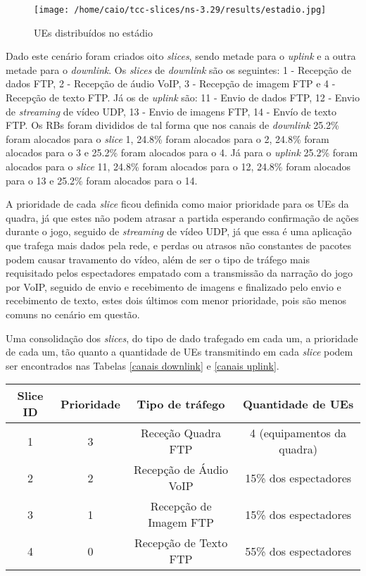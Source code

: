 \documentclass[12pt, a4paper]{article}
\begin{document}
\begin{figure}[H]
	\centering
	\texttt{[image: /home/caio/tcc-slices/ns-3.29/results/estadio.jpg]}
	\caption{UEs distribuídos no estádio}
	\label{estádio}
\end{figure}

Dado este cenário foram criados oito \textit{slices}, sendo metade para o \textit{uplink} e a outra metade para o \textit{downlink}. Os \textit{slices} de  \textit{downlink} são os seguintes: 1 - Recepção de dados FTP, 2 - Recepção de áudio VoIP, 3 - Recepção de imagem FTP e 4 - Recepção de texto FTP. Já os de \textit{uplink} são: 11 - Envio de dados FTP, 12 - Envio de \textit{streaming} de vídeo UDP, 13 - Envio de imagens FTP, 14 - Envío de texto FTP. Os RBs foram divididos de tal forma que nos canais de \textit{downlink} 25.2\% foram alocados para o \textit{slice} 1, 24.8\% foram alocados para o 2, 24.8\% foram alocados para o 3 e 25.2\% foram alocados para o 4. Já para o  \textit{uplink} 25.2\% foram alocados para o \textit{slice} 11, 24.8\% foram alocados para o 12, 24.8\% foram alocados para o 13 e 25.2\% foram alocados para o 14.

A prioridade de cada \textit{slice} ficou definida como maior prioridade para os UEs da quadra, já que estes não podem atrasar a partida esperando confirmação de ações durante o jogo, seguido de \textit{streaming} de vídeo UDP, já que essa é uma aplicação que trafega mais dados pela rede, e perdas ou atrasos não constantes de pacotes podem causar travamento do vídeo, além de ser o tipo de tráfego mais requisitado pelos espectadores empatado com a transmissão da narração do jogo por VoIP, seguido de envio e recebimento de imagens e finalizado pelo envio e recebimento de texto, estes dois últimos com menor prioridade, pois são menos comuns no cenário em questão.

Uma consolidação dos \textit{slices}, do tipo de dado trafegado em cada um, a prioridade de cada um, tão quanto a quantidade de UEs transmitindo em cada \textit{slice} podem ser encontrados nas Tabelas \ref{canais downlink} e \ref{canais uplink}. 

\begin{table*}[!htb]
	\setlength{\tabcolsep}{5mm}
	\centering
	\begin{tabular}{c|c|c|c}
		\toprule
		Slice ID & Prioridade & Tipo de tráfego & Quantidade de UEs 
		\\
		\midrule
		1 & 3 & Receção Quadra FTP & 4 (equipamentos da quadra)
		\\
		2 & 2 & Recepção de Áudio VoIP & 15\% dos espectadores
		\\
		3 & 1 & Recepção de Imagem FTP & 15\% dos espectadores
		\\
		4 & 0 & Recepção de Texto FTP & 55\% dos espectadores
		\\
		\bottomrule
	\end{tabular}
	\caption{Slices de Downlink e UEs na rede}
	\label{canais downlink}
\end{table*}
\end{document}
